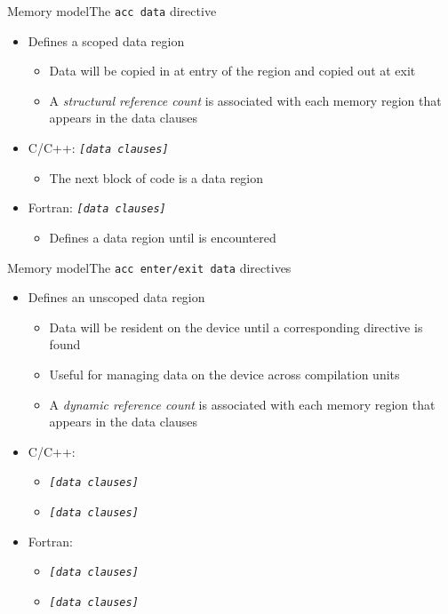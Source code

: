 \documentclass[12pt,aspectratio=169]{beamer}
\begin{document}
\begin{frame}[fragile]{Memory model}{The \texttt{acc data} directive}
  \begin{itemize}
  \item Defines a scoped data region
    \begin{itemize}
    \item Data will be copied in at entry of the region and copied out at exit
    \item A \emph{structural reference count} is associated with each memory region that appears in the data clauses
    \end{itemize}
    \vfill
  \item C/C++:  \emph{\texttt{[data clauses]}}
    \begin{itemize}
    \item The next block of code is a data region
    \end{itemize}
    \vfill
  \item Fortran:  \emph{\texttt{[data clauses]}}
    \begin{itemize}
    \item Defines a data region until  is encountered
    \end{itemize}
  \end{itemize}
\end{frame}

\begin{frame}[fragile]{Memory model}{The \texttt{acc enter/exit data} directives}
  \begin{itemize}
  \item Defines an unscoped data region
    \begin{itemize}
    \item Data will be resident on the device until a corresponding  directive is found
    \item Useful for managing data on the device across compilation units
    \item A \emph{dynamic reference count} is associated with each memory region that appears in the data clauses
    \end{itemize}
    \vfill
  \item C/C++:
    \begin{itemize}
    \item {} \emph{\texttt{[data clauses]}}
    \item{} \emph{\texttt{[data clauses]}}
    \end{itemize}
    \vfill
  \item Fortran:
    \begin{itemize}
    \item {} \emph{\texttt{[data clauses]}}
    \item {} \emph{\texttt{[data clauses]}}
    \end{itemize}
  \end{itemize}
\end{frame}
\end{document}
